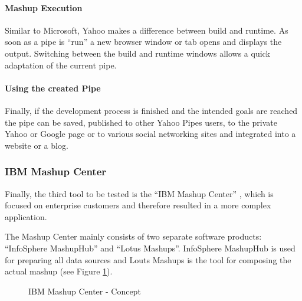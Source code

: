 \paragraph{Mashup Execution}
Similar to Microsoft, Yahoo makes a difference between build and runtime. As soon as a pipe is
``run'' a new browser window or tab opens and displays the output. Switching between the build and
runtime windows allows a quick adaptation of the current pipe.

\paragraph{Using the created Pipe}
Finally, if the development process is finished and the intended goals are
reached the pipe can be saved, published to other Yahoo Pipes users, to the
private Yahoo or Google page or to various social networking sites and
integrated into a website or a blog.

\subsubsection{IBM Mashup Center}
\label{sec:ibm_mashup_center}

Finally, the third tool to be tested is the ``IBM Mashup Center''
\cite{ibm_mashup_center}, which is focused on enterprise customers and
therefore resulted in a more complex application.

The Mashup Center mainly consists of two separate software products: ``InfoSphere MashupHub'' and ``Lotus
Mashups''. InfoSphere MashupHub is used for preparing all data sources and Louts Mashups is the
tool for composing the actual mashup (see Figure \ref{fig:ibm_mashup_center_concept}).

\begin{figure}
	\centering
	\caption{IBM Mashup Center - Concept}
	\label{fig:ibm_mashup_center_concept}
\end{figure}

